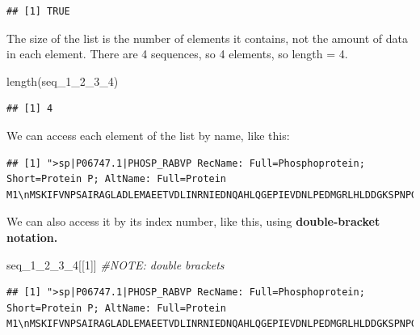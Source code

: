 \documentclass[
]{book}
\newenvironment{Shaded}{\begin{snugshade}}{\end{snugshade}}
\newcommand{\CommentTok}[1]{\textcolor[rgb]{0.56,0.35,0.01}{\textit{#1}}}
\newcommand{\DecValTok}[1]{\textcolor[rgb]{0.00,0.00,0.81}{#1}}
\newcommand{\FunctionTok}[1]{\textcolor[rgb]{0.00,0.00,0.00}{#1}}
\newcommand{\NormalTok}[1]{#1}
\newcommand{\SpecialCharTok}[1]{\textcolor[rgb]{0.00,0.00,0.00}{#1}}
\begin{document}
\begin{verbatim}
## [1] TRUE
\end{verbatim}

The size of the list is the number of elements it contains, not the amount of data in each element. There are 4 sequences, so 4 elements, so length = 4.

\begin{Shaded}
\begin{Highlighting}[]
\FunctionTok{length}\NormalTok{(seq\_1\_2\_3\_4)}
\end{Highlighting}
\end{Shaded}

\begin{verbatim}
## [1] 4
\end{verbatim}

We can access each element of the list by name, like this:

\begin{Shaded}
\end{Shaded}

\begin{verbatim}
## [1] ">sp|P06747.1|PHOSP_RABVP RecName: Full=Phosphoprotein; Short=Protein P; AltName: Full=Protein M1\nMSKIFVNPSAIRAGLADLEMAEETVDLINRNIEDNQAHLQGEPIEVDNLPEDMGRLHLDDGKSPNPGEMA\nKVGEGKYREDFQMDEGEDPSLLFQSYLDNVGVQIVRQIRSGERFLKIWSQTVEEIISYVAVNFPNPPGKS\nSEDKSTQTTGRELKKETTPTPSQRESQSSKARMAAQTASGPPALEWSATNEEDDLSVEAEIAHQIAESFS\nKKYKFPSRSSGILLYNFEQLKMNLDDIVKEAKNVPGVTRLARDGSKLPLRCVLGWVALANSKKFQLLVES\nNKLSKIMQDDLNRYTSC\n\n"
\end{verbatim}

We can also access it by its index number, like this, using \textbf{double-bracket notation.}

\begin{Shaded}
\begin{Highlighting}[]
\NormalTok{seq\_1\_2\_3\_4[[}\DecValTok{1}\NormalTok{]] }\CommentTok{\#NOTE: double brackets}
\end{Highlighting}
\end{Shaded}

\begin{verbatim}
## [1] ">sp|P06747.1|PHOSP_RABVP RecName: Full=Phosphoprotein; Short=Protein P; AltName: Full=Protein M1\nMSKIFVNPSAIRAGLADLEMAEETVDLINRNIEDNQAHLQGEPIEVDNLPEDMGRLHLDDGKSPNPGEMA\nKVGEGKYREDFQMDEGEDPSLLFQSYLDNVGVQIVRQIRSGERFLKIWSQTVEEIISYVAVNFPNPPGKS\nSEDKSTQTTGRELKKETTPTPSQRESQSSKARMAAQTASGPPALEWSATNEEDDLSVEAEIAHQIAESFS\nKKYKFPSRSSGILLYNFEQLKMNLDDIVKEAKNVPGVTRLARDGSKLPLRCVLGWVALANSKKFQLLVES\nNKLSKIMQDDLNRYTSC\n\n"
\end{verbatim}
\end{document}
